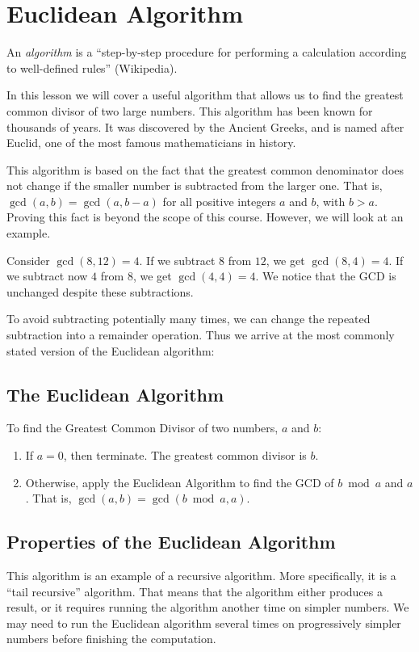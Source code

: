 \documentclass[a4paper,10pt]{report}
\begin{document}
\section{Euclidean Algorithm}
An \emph{algorithm} is a ``step-by-step procedure for performing a calculation
according to well-defined rules'' (Wikipedia).

In this lesson we will cover a useful algorithm that allows us to find the
greatest common divisor of two large numbers. This algorithm has been known for
thousands of years. It was discovered by the Ancient Greeks, and is named after
Euclid, one of the most famous mathematicians in history.

This algorithm is based on the fact that the greatest common denominator does
not change if the smaller number is subtracted from the larger one. That is,
$\gcd(a, b) = \gcd(a, b - a)$ for all positive integers $a$ and $b$, with $b>a$.
Proving this fact is beyond the scope of this course. However, we will look at
an example.

Consider $\gcd(8, 12)=4$. If we subtract $8$ from $12$, we get $\gcd(8, 4)=4$.
If we subtract now $4$ from $8$, we get $\gcd(4, 4)=4$. We notice that the GCD
is unchanged despite these subtractions.

To avoid subtracting potentially many times, we can change the repeated
subtraction into a remainder operation. Thus we arrive at the most commonly
stated version of the Euclidean algorithm:

\subsection{The Euclidean Algorithm}

To find the Greatest Common Divisor of two numbers, $a$ and $b$:
\begin{enumerate}
 \item If $a=0$, then terminate. The greatest common divisor is $b$.
 \item Otherwise, apply the Euclidean Algorithm to find the GCD of $b \bmod a$
 and $a$. That is, $\gcd(a, b) = \gcd(b \bmod a, a)$.
\end{enumerate}

\subsection{Properties of the Euclidean Algorithm}

This algorithm is an example of a recursive algorithm. More specifically, it is
a ``tail recursive'' algorithm. That means that the algorithm either produces a
result, or it requires running the algorithm another time on simpler numbers. We
may need to run the Euclidean algorithm several times on progressively simpler
numbers before finishing the computation.
\end{document}
